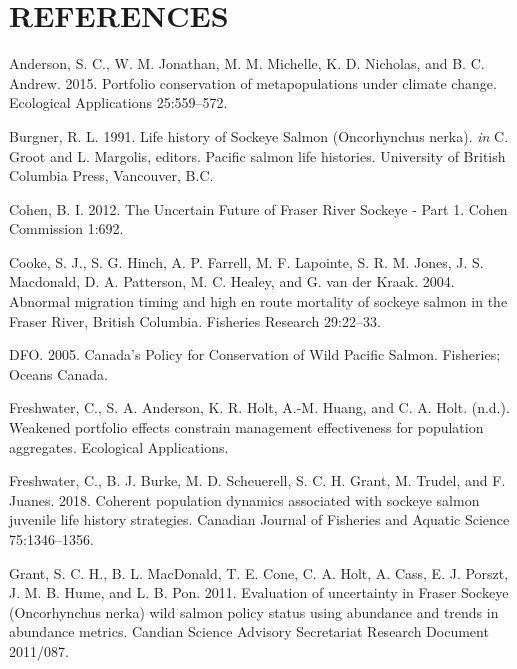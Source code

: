 \documentclass[11pt]{book}
\begin{document}
\clearpage

\section*{REFERENCES}\label{references}
{}
\noindent
\vspace{-2em}
\setlength{\parindent}{-0.2in}
\setlength{\leftskip}{0.2in}
\setlength{\parskip}{8pt}

\hypertarget{refs}{}
\hypertarget{ref-Anderson2015}{}
Anderson, S. C., W. M. Jonathan, M. M. Michelle, K. D. Nicholas, and B. C. Andrew. 2015. Portfolio conservation of metapopulations under climate change. Ecological Applications 25:559--572.

\hypertarget{ref-Burgner1991}{}
Burgner, R. L. 1991. Life history of Sockeye Salmon (Oncorhynchus nerka). \emph{in} C. Groot and L. Margolis, editors. Pacific salmon life histories. University of British Columbia Press, Vancouver, B.C.

\hypertarget{ref-Cohen2012}{}
Cohen, B. I. 2012. The Uncertain Future of Fraser River Sockeye - Part 1. Cohen Commission 1:692.

\hypertarget{ref-Cooke2004}{}
Cooke, S. J., S. G. Hinch, A. P. Farrell, M. F. Lapointe, S. R. M. Jones, J. S. Macdonald, D. A. Patterson, M. C. Healey, and G. van der Kraak. 2004. Abnormal migration timing and high en route mortality of sockeye salmon in the Fraser River, British Columbia. Fisheries Research 29:22--33.

\hypertarget{ref-DFO2005}{}
DFO. 2005. Canada's Policy for Conservation of Wild Pacific Salmon. Fisheries; Oceans Canada.

\hypertarget{ref-FreshwaterSub}{}
Freshwater, C., S. A. Anderson, K. R. Holt, A.-M. Huang, and C. A. Holt. (n.d.). Weakened portfolio effects constrain management effectiveness for population aggregates. Ecological Applications.

\hypertarget{ref-Freshwater2018}{}
Freshwater, C., B. J. Burke, M. D. Scheuerell, S. C. H. Grant, M. Trudel, and F. Juanes. 2018. Coherent population dynamics associated with sockeye salmon juvenile life history strategies. Canadian Journal of Fisheries and Aquatic Science 75:1346--1356.

\hypertarget{ref-Grant2011}{}
Grant, S. C. H., B. L. MacDonald, T. E. Cone, C. A. Holt, A. Cass, E. J. Porszt, J. M. B. Hume, and L. B. Pon. 2011. Evaluation of uncertainty in Fraser Sockeye (Oncorhynchus nerka) wild salmon policy status using abundance and trends in abundance metrics. Candian Science Advisory Secretariat Research Document 2011/087.
\end{document}
